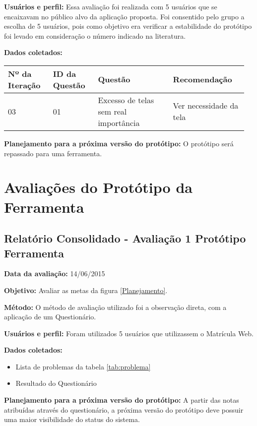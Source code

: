 \textbf{Usuários e perfil:}
Essa avaliação foi realizada com 5 usuários que se encaixavam no público alvo da aplicação proposta. 
Foi consentido pelo grupo a escolha de 5 usuários, pois como objetivo era verificar a estabilidade
do protótipo foi levado em consideração o número indicado na literatura.

\textbf{Dados coletados:}

\begin{table*}[!h]
\caption{Lista de problemas. Fonte: \cite{preece} adaptado}
\label{tab:problema}
  \begin{tabular}{p{0.18\linewidth}p{0.18\linewidth}p{0.30\linewidth}p{0.30\linewidth}}
  \hline
    Nº da Iteração & ID da Questão & Questão & Recomendação\\
 \hline
    03 & 01 & Excesso de telas sem real importância & Ver necessidade da tela\\
  \end{tabular}
\end{table*}

\textbf{Planejamento para a próxima versão do protótipo:}
O protótipo será repassado para uma ferramenta.
 
\pagebreak

\section{Avaliações do Protótipo da Ferramenta}

\subsection{Relatório Consolidado - Avaliação 1 Protótipo Ferramenta}

\flushleft \textbf{Data da avaliação:} 
14/06/2015

\textbf{Objetivo:}
Avaliar as metas da figura \ref{Planejamento}.

\textbf{Método:}
O método de avaliação utilizado foi a observação direta, com a aplicação de um Questionário.

\textbf{Usuários e perfil:}
Foram utilizados 5 usuários que utilizassem o Matrícula Web.

\textbf{Dados coletados:}

\begin{itemize}
 \item Lista de problemas da tabela \ref{tab:problema}
 \item Resultado do Questionário
\end{itemize}


\textbf{Planejamento para a próxima versão do protótipo:}
A partir das notas atribuídas através do questionário, a próxima versão do protótipo deve possuir uma maior visibilidade do status do sistema.

\vfill
\pagebreak
